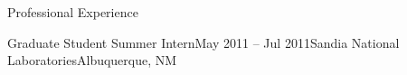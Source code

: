 \begin{rSection}{Professional Experience}
\begin{rExperienceBullets}{Graduate Student Summer Intern}{May 2011 -- Jul 2011}{Sandia National Laboratories}{Albuquerque, NM}
\end{rExperienceBullets}


%
%
%
%
%
%
%

\end{rSection}
